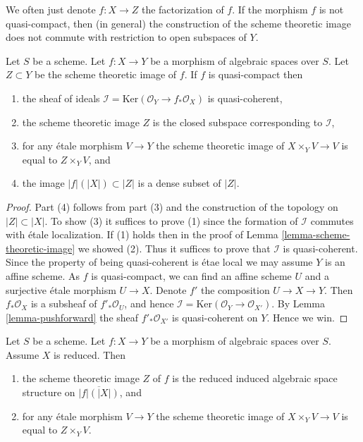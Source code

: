 \noindent
We often just denote $f : X \to Z$ the factorization of $f$.
If the morphism $f$ is not quasi-compact, then (in general) the
construction of the scheme theoretic image does not commute with
restriction to open subspaces of $Y$.

\begin{lemma}
\label{lemma-quasi-compact-scheme-theoretic-image}
Let $S$ be a scheme.
Let $f : X \to Y$ be a morphism of algebraic spaces over $S$.
Let $Z \subset Y$ be the scheme theoretic image of $f$.
If $f$ is quasi-compact then
\begin{enumerate}
\item the sheaf of ideals
$\mathcal{I} = \text{Ker}(\mathcal{O}_Y \to f_*\mathcal{O}_X)$
is quasi-coherent,
\item the scheme theoretic image $Z$ is the closed subspace
corresponding to $\mathcal{I}$,
\item for any \'etale morphism $V \to Y$ the scheme theoretic image of
$X \times_Y V \to V$ is equal to $Z \times_Y V$, and
\item the image $|f|(|X|) \subset |Z|$ is a dense subset of $|Z|$.
\end{enumerate}
\end{lemma}

\begin{proof}
Part (4) follows from part (3) and the construction of the topology
on $|Z| \subset |X|$. To show (3) it suffices to prove (1) since the
formation of $\mathcal{I}$ commutes with \'etale localization.
If (1) holds then in the proof of Lemma \ref{lemma-scheme-theoretic-image}
we showed (2). Thus it suffices to prove that $\mathcal{I}$ is quasi-coherent.
Since the property of being quasi-coherent is \'etae local we may assume
$Y$ is an affine scheme. As $f$ is quasi-compact,
we can find an affine scheme $U$ and a surjective \'etale morphism
$U \to X$. Denote $f'$ the composition $U \to X \to Y$.
Then $f_*\mathcal{O}_X$ is a subsheaf of $f'_*\mathcal{O}_U$,
and hence $\mathcal{I} = \text{Ker}(\mathcal{O}_Y \to \mathcal{O}_{X'})$.
By Lemma \ref{lemma-pushforward}
the sheaf $f'_*\mathcal{O}_{X'}$ is quasi-coherent on $Y$. Hence we win.
\end{proof}

\begin{lemma}
\label{lemma-scheme-theoretic-image-reduced}
Let $S$ be a scheme. Let $f : X \to Y$ be a morphism of algebraic spaces
over $S$. Assume $X$ is reduced. Then
\begin{enumerate}
\item the scheme theoretic image $Z$ of $f$ is the reduced induced algebraic
space structure on $\overline{|f|(|X|)}$, and
\item for any \'etale morphism $V \to Y$ the scheme theoretic image of
$X \times_Y V \to V$ is equal to $Z \times_Y V$.
\end{enumerate}
\end{lemma}

